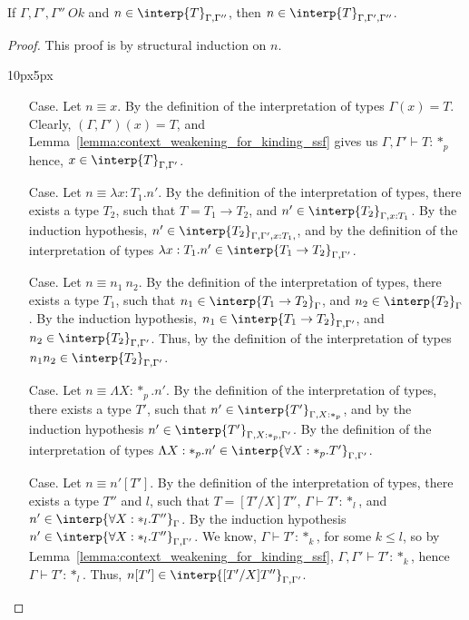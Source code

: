 \begin{lemma}
  If $\Gamma,\Gamma',\Gamma''\ Ok$ and $n \in \interp{T}_{\Gamma,\Gamma''}$, then 
  $n \in \interp{T}_{\Gamma,\Gamma',\Gamma''}$.
  \label{lemma:context_weakening_interpretations_ssf}
\end{lemma}
\begin{proof}
  This proof is by structural induction on $n$.
  \vspace{-25px}
  \begin{changemargin}{10px}{5px}\noindent
\begin{itemize}
\item[Case.]  Let $n \equiv x$.  By the definition of the interpretation of types 
  $\Gamma(x) = T$.  Clearly,
  $(\Gamma,\Gamma')(x) = T$, and Lemma~\ref{lemma:context_weakening_for_kinding_ssf} gives 
  us $\Gamma,\Gamma' \vdash T:*_p$ hence, $x \in \interp{T}_{\Gamma,\Gamma'}$.
  
\item[Case.]  Let $n \equiv \lambda x:T_1.n'$.  By the definition of the interpretation of 
  types, there exists a type $T_2$, such that $T = T_1 \rightarrow T_2$, and 
  $n' \in \interp{T_2}_{\Gamma,x:T_1}$.  By
  the induction hypothesis, $n' \in \interp{T_2}_{\Gamma,\Gamma',x:T_1,}$, and by the 
  definition of the interpretation of types 
  $\lambda x:T_1.n' \in \interp{T_1 \rightarrow T_2}_{\Gamma,\Gamma'}$.
  
\item[Case.]  Let $n \equiv n_1\ n_2$.  By the definition of the interpretation of types, there 
  exists a type $T_1$, such that 
  $n_1 \in \interp{T_1 \rightarrow T_2}_\Gamma$, and $n_2 \in \interp{T_2}_\Gamma$.  By 
  the induction hypothesis,
  $n_1 \in \interp{T_1 \rightarrow T_2}_{\Gamma,\Gamma'}$, and 
  $n_2 \in \interp{T_2}_{\Gamma,\Gamma'}$.  Thus, by
  the definition of the interpretation of types $n_1n_2 \in \interp{T_2}_{\Gamma,\Gamma'}$.
  
\item[Case.]  Let $n \equiv \Lambda X:*_p.n'$.  By the definition of the interpretation of 
  types, there exists a type $T'$, such that
  $n' \in \interp{T'}_{\Gamma,X:*_p}$, and by the induction hypothesis 
  $n' \in \interp{T'}_{\Gamma,X:*_p,\Gamma'}$.  By the
  definition of the interpretation of types 
  $\Lambda X:*_p.n' \in \interp{\forall X:*_p.T'}_{\Gamma,\Gamma'}$.
  
\item[Case.]  Let $n \equiv n'[T']$.  By the definition of the interpretation of types, 
  there exists a type $T''$ and $l$, 
  such that $T = [T'/X]T''$, $\Gamma \vdash T':*_l$, and 
  $n' \in \interp{\forall X:*_l.T''}_{\Gamma}$.  By the induction
  hypothesis $n' \in \interp{\forall X:*_l.T''}_{\Gamma,\Gamma'}$.  We know, 
  $\Gamma \vdash T':*_k$, for some $k \leq l$, so by
  Lemma~\ref{lemma:context_weakening_for_kinding_ssf}, $\Gamma,\Gamma' \vdash T':*_k$, 
  hence 
  $\Gamma \vdash T':*_l$. Thus, $n[T'] \in
  \interp{[T'/X]T''}_{\Gamma,\Gamma'}$.
\end{itemize}
\end{changemargin}
\end{proof}

